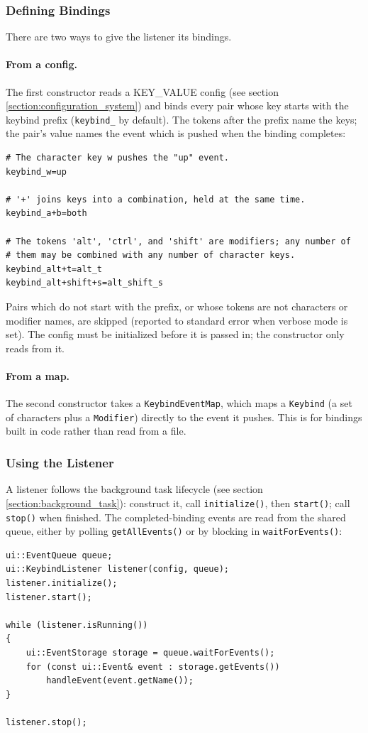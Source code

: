 \subsubsection{Defining Bindings}

There are two ways to give the listener its bindings.

\paragraph{From a config.} The first constructor reads a KEY\_VALUE config (see section \ref{section:configuration_system}) and binds every pair whose key starts with the keybind prefix (\texttt{keybind\_} by default). The tokens after the prefix name the keys; the pair's value names the event which is pushed when the binding completes:
\begin{lstlisting}[style=makestyle]
# The character key w pushes the "up" event.
keybind_w=up

# '+' joins keys into a combination, held at the same time.
keybind_a+b=both

# The tokens 'alt', 'ctrl', and 'shift' are modifiers; any number of
# them may be combined with any number of character keys.
keybind_alt+t=alt_t
keybind_alt+shift+s=alt_shift_s
\end{lstlisting}
Pairs which do not start with the prefix, or whose tokens are not characters or modifier names, are skipped (reported to standard error when verbose mode is set). The config must be initialized before it is passed in; the constructor only reads from it.

\paragraph{From a map.} The second constructor takes a \texttt{KeybindEventMap}, which maps a \texttt{Keybind} (a set of characters plus a \texttt{Modifier}) directly to the event it pushes. This is for bindings built in code rather than read from a file.

\subsubsection{Using the Listener}

A listener follows the background task lifecycle (see section \ref{section:background_task}): construct it, call \texttt{initialize()}, then \texttt{start()}; call \texttt{stop()} when finished. The completed-binding events are read from the shared queue, either by polling \texttt{getAllEvents()} or by blocking in \texttt{waitForEvents()}:
\begin{lstlisting}[style=cppstyle]
ui::EventQueue queue;
ui::KeybindListener listener(config, queue);
listener.initialize();
listener.start();

while (listener.isRunning())
{
    ui::EventStorage storage = queue.waitForEvents();
    for (const ui::Event& event : storage.getEvents())
        handleEvent(event.getName());
}

listener.stop();
\end{lstlisting}

